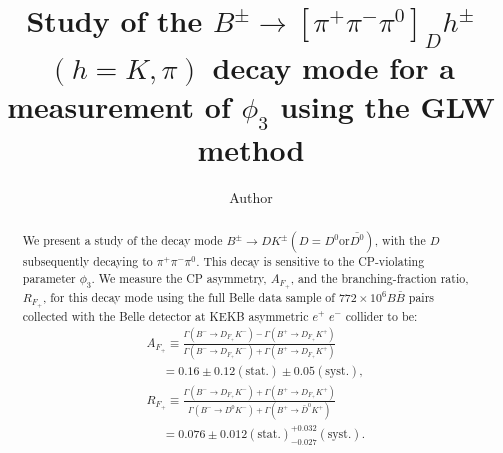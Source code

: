 \documentclass[aps,prl,twocolumn,superscriptaddress,showpacs,preprintnumbers,amsmath,amssymb]{revtex4}
\begin{document}



\title{ \quad\\[1.0cm] Study of the $B^{\pm} \rightarrow [\pi^{+} \pi^{-} \pi^{0}]_{D} h^{\pm}$ $(h = K, \pi)$ decay mode for a measurement of $\phi_3$ using the GLW method}

\author{Author}
\noaffiliation

\begin{abstract}
We present a study of the decay mode $B^{\pm} \rightarrow DK^{\pm} (D = D^{0} \mathrm{or} \bar{D^{0}})$, with the $D$ subsequently decaying to $\pi^{+} \pi^{-} \pi^{0}$. This decay is sensitive to the CP-violating parameter $\phi_{3}$. We measure the CP asymmetry, $A_{F_+}$, and the branching-fraction ratio, $R_{F_+}$, for this decay mode using the full Belle data sample of $772 \times 10^6 B\bar{B}$ pairs collected with the Belle detector at KEKB asymmetric $e^{+}$ $e^{-}$ collider to be:
\begin{align}
&A_{F_+} \equiv \frac{\Gamma(B^- \rightarrow D_{F_+}K^-) - \Gamma(B^+ \rightarrow D_{F_+}K^+)}{\Gamma(B^- \rightarrow D_{F_+}K^-) + \Gamma(B^+ \rightarrow D_{F_+}K^+)} \nonumber \\
&~~~~~~= 0.16 \pm 0.12 (\mathrm{stat.}) \pm 0.05 (\mathrm{syst.}) , \nonumber\\
&R_{F_+} \equiv \frac{\Gamma(B^- \rightarrow D_{F_+}K^-) + \Gamma(B^+ \rightarrow D_{F_+}K^+)}{\Gamma(B^- \rightarrow D^0K^-) + \Gamma(B^+ \rightarrow \bar{D}^0K^+)} \nonumber \\
&~~~~~~= 0.076 \pm 0.012 (\mathrm{stat.})  ^{+0.032} _{-0.027} (\mathrm{syst.}) \nonumber. 
\end{align}
\end{abstract}

\end{document}
